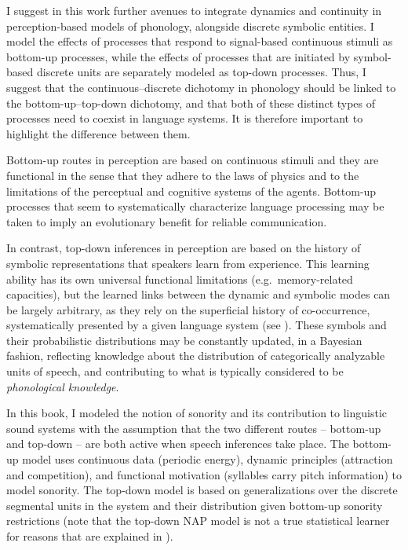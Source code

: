 I suggest in this work
further avenues to integrate dynamics and continuity in perception-based models of phonology, alongside discrete symbolic entities.
I model the
effects of processes that respond to signal-based continuous stimuli %
as bottom-up processes, while the effects of processes that are initiated by symbol-based discrete units are separately modeled as top-down processes.
Thus, %
I 
suggest that the continuous--discrete dichotomy in phonology should be linked to the bottom-up--top-down dichotomy, and that both of these distinct types of processes need to coexist in language systems.
It is therefore important to highlight the difference between them.

Bottom-up routes in perception are based on continuous stimuli and they are functional in the sense that they adhere to the laws of physics and to the limitations of the perceptual and cognitive systems of the agents.
Bottom-up processes that seem to systematically characterize language processing may be taken to imply an evolutionary benefit for reliable communication.

In contrast, top-down inferences in perception are based on the history of symbolic representations that speakers learn from experience.
This learning ability has its own universal functional limitations (e.g.~memory-related capacities),
but the learned links between the dynamic and symbolic modes can be largely arbitrary, as they rely on the superficial history of co-occurrence, systematically presented by a given language system (see ).
These symbols and their probabilistic distributions may be constantly updated, in a Bayesian fashion, reflecting knowledge about the distribution of categorically analyzable units of speech, and contributing to what is typically considered to be \emph{phonological knowledge}.

In this book, I modeled the notion of sonority and its contribution to linguistic sound systems 
with the assumption that the two different routes -- bottom-up and top-down -- are both active when speech inferences take place. The bot\-tom-up model uses continuous data (periodic energy), dynamic principles (attraction and competition), and functional motivation (syllables carry pitch information) to model sonority. The top-down model is based on generalizations over the discrete segmental units in the system and their distribution given bottom-up sonority restrictions (note that the top-down NAP model is not a true statistical learner for reasons that are explained in ).


